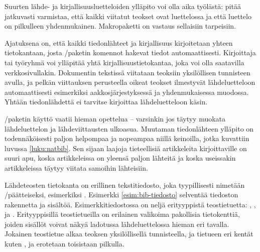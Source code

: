 Suurten lähde- ja kirjallisuusluetteloiden ylläpito voi olla aika
työlästä: pitää jatkuvasti varmistaa, että kaikki viitatut teokset ovat
luettelossa ja että luettelo on pilkulleen yhdenmukainen. Makropaketti
 on vastaus sellaisiin tarpeisiin.

Ajatuksena on, että kaikki tiedonlähteet ja kirjallisuus kirjoitetaan
yhteen tietokantaan, josta \-/paketin komennot hakevat
tiedot automaattisesti. Kirjoittaja tai työryhmä voi ylläpitää yhtä
kirjallisuustietokantaa, joka voi olla saatavilla verkkosivullakin.
Dokumentin tekstissä viitataan teoksiin yksilöllisen tunnisteen avulla,
ja pelkän viittauksen perusteella oikeat teokset ilmestyvät
lähdeluetteloon automaattisesti esimerkiksi aakkosjärjestyksessä ja
yhdenmukaisessa muodossa. Yhtään tiedonlähdettä ei tarvitse kirjoittaa
lähdeluetteloon käsin.

\-/paketin käyttö vaatii hieman opettelua -- varsinkin
jos täytyy muokata lähdeluettelon ja lähdeviittausten ulkoasua. Muutaman
tiedonlähteen ylläpito on todennäköisesti paljon helpompaa ja nopeampaa
niillä keinoilla, jotka kuvattiin luvussa \ref{luku:natbib}. Sen sijaan
laajoja tieteellisiä artikkeleita kirjoittaville  on
suuri apu, koska artikkeleissa on yleensä paljon lähteitä ja koska
useissakin artikkeleissa täytyy viitata samoihin lähteisiin.

Lähdeteosten tietokanta on erillinen tekstitiedosto, joka tyypillisesti
nimetään \-/päätteiseksi, esimerkiksi
. Esimerkki \ref{esim:bib-tiedosto} selventää
tiedoston rakennetta ja sisältöä. Esimerkkitiedostossa on neljä
erityyppistä teostietuetta: , ,
 ja . Erityyppisillä teostietueilla on
erilainen valikoima pakollisia tietokenttiä, joiden sisällöt voivat
näkyä ladotussa lähdeluettelossa hieman eri tavalla. Jokainen teostietue
alkaa teoksen yksilöllisellä tunnisteella, ja tietueen eri kentät kuten
,  ja  erotetaan toisistaan
pilkulla.

